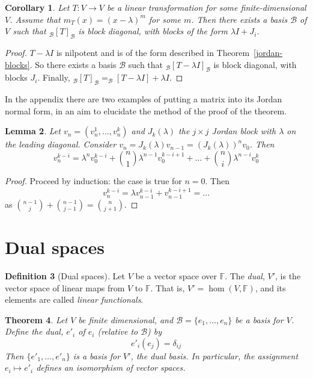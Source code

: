 \documentclass[10pt,fleqn]{article}
\newcommand{\field}{\mathbb{F}}
\newcommand{\basis}{\mathcal{B}}
\theoremstyle{definition} \newtheorem{defn}{Definition}[section]
\theoremstyle{plain}      \newtheorem{thm}[defn]{Theorem}
\theoremstyle{plain}      \newtheorem{prop}[defn]{Proposition}
\theoremstyle{plain}      \newtheorem{lem}[defn]{Lemma}
\theoremstyle{plain}      \newtheorem{cor}[defn]{Corollary}
\theoremstyle{plain}      \newtheorem{ad}[defn]{Addendum}
\theoremstyle{definition} \newtheorem{ex}[defn]{Example}
\theoremstyle{definition} \newtheorem{rem}[defn]{Remark}
\numberwithin{equation}{subsection}
\begin{document}
\begin{cor}
    Let $T:V\to V$ be a linear transformation for some finite-dimensional $V$.
    Assume that $m_T(x)=(x-\lambda)^m$ for some $m$.
    Then there exists a basis $\basis$ of $V$ such that $_{\basis}[T]_{\basis}$ is block diagonal, with blocks of the form $\lambda I+J_i$.
\end{cor}

\begin{proof}
    $T-\lambda I$ is nilpotent and is of the form described in Theorem~\ref{jordan-blocks}.
    So there exists a basis $\basis$ such that $_{\basis}[T-\lambda I]_{\basis}$ is block diagonal, with blocks $J_i$.
    Finally, $_{\basis}[T]_{\basis}=_{\basis}[T-\lambda I]+\lambda I$.
\end{proof}

In the appendix there are two examples of putting a matrix into its Jordan normal form, in an aim to elucidate the method of the proof of the theorem.

\begin{lem}
    Let $v_n=(v_n^1,\ldots,v_n^k)$ and $J_k(\lambda)$ the $j\times j$ Jordan block with $\lambda$ on the leading diagonal.
    Consider $v_n=J_k(\lambda)v_{n-1}=(J_k(\lambda))^nv_0$.
    Then
    \[
        v_n^{k-i}=
        \lambda^n v_0^{k-i}+{n\choose 1}\lambda^{n-1}v_0^{k-i+1}+\ldots+{n\choose i}\lambda^{n-i}v_0^k
    \]
\end{lem}

\begin{proof}
    Proceed by induction: the case is true for $n=0$.
    Then
    \[
        v_n^{k-i}=
        \lambda v_{n-1}^{k-i}+v_{n-1}^{k-i+1}=\ldots
    \]
    as ${{n-1}\choose j}+{{n-1}\choose{j-1}}={n\choose{j+1}}$.
\end{proof}


\section{Dual spaces}

\begin{defn}[Dual spaces]
    Let $V$ be a vector space over $\field$.
    The \emph{dual}, $V'$, is the vector space of linear maps from $V$ to $\field$.
    That is, $V'=\hom(V,\field)$, and its elements are called \emph{linear functionals}.
\end{defn}

\begin{thm}
    Let $V$ be finite dimensional, and $\basis=\{e_1,\ldots,e_n\}$ be a basis for $V$.
    Define the \emph{dual}, $e'_i$ of $e_i$ (relative to $\basis$) by
    \[
        e'_i(e_j)=
        \delta_{ij}
    \]
    Then $\{e'_1,\ldots,e'_n\}$ is a basis for $V'$, the \emph{dual basis}.
    In particular, the assignment $e_i\mapsto e'_i$ defines an isomorphism of vector spaces.
\end{thm}
\end{document}
